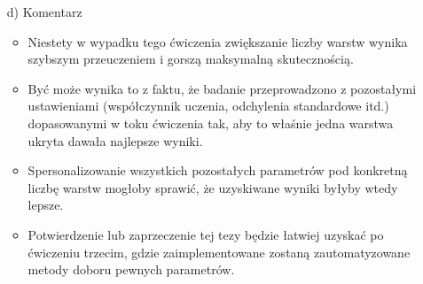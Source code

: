 \documentclass[17pt]{article}
\begin{document}
\begin{enumerate}
\begin{table}[ht]
\end{table}

\item[d)] Komentarz
\begin{itemize}
\item Niestety w wypadku tego ćwiczenia zwiększanie liczby warstw wynika szybszym przeuczeniem i gorszą maksymalną skutecznością. \item Być może wynika to z faktu, że badanie przeprowadzono z pozostałymi ustawieniami (współczynnik uczenia, odchylenia standardowe itd.) dopasowanymi w toku ćwiczenia tak, aby to właśnie jedna warstwa ukryta dawała najlepsze wyniki.
\item Spersonalizowanie wszystkich pozostałych parametrów pod konkretną liczbę warstw mogłoby sprawić, że uzyskiwane wyniki byłyby wtedy lepsze.
\item Potwierdzenie lub zaprzeczenie tej tezy będzie łatwiej uzyskać po ćwiczeniu trzecim, gdzie zaimplementowane zostaną zautomatyzowane metody doboru pewnych parametrów.


\end{itemize}

\end{enumerate}
\newpage
\end{document}
